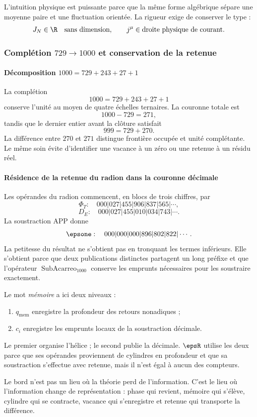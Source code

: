 L'intuition physique est puissante parce que la même forme algébrique sépare une
moyenne paire et une fluctuation orientée. La rigueur exige de conserver le type :
\[
J_N\in\R\quad\text{sans dimension},
\qquad
j^\mu\in\text{droite physique de courant}.
\]

\subsubsection{Complétion \(729\to1000\) et conservation de la retenue}

\paragraph{Décomposition \(1000=729+243+27+1\)}

La complétion
\[
1000=729+243+27+1
\]
conserve l'unité au moyen de quatre échelles ternaires. La couronne totale est
\[
1000-729=271,
\]
tandis que le dernier entier avant la clôture satisfait
\[
999=729+270.
\]
La différence entre \(270\) et \(271\) distingue frontière occupée et unité
complétante. Le même soin évite d'identifier une vacance à un zéro ou une
retenue à un résidu réel.

\paragraph{Résidence de la retenue du radion dans la couronne décimale}

Les opérandes du radion commencent, en blocs de trois chiffres, par
\[
\Phi_T:\quad000|027|455|906|837|565|\cdots,
\]
\[
D_E:\quad000|027|455|010|034|743|\cdots.
\]
La soustraction APP donne
\[
\epsone:\quad000|000|000|896|802|822|\cdots.
\]
La petitesse du résultat ne s'obtient pas en tronquant les termes inférieurs.
Elle s'obtient parce que deux publications distinctes partagent un long préfixe et que
l'opérateur \(\operatorname{SubAcarreo}_{1000}\) conserve les emprunts nécessaires
pour les soustraire exactement.

Le mot \emph{mémoire} a ici deux niveaux :
\begin{enumerate}
\item \(q_{\mathrm{mem}}\) enregistre la profondeur des retours nonadiques ;
\item \(c_i\) enregistre les emprunts locaux de la soustraction décimale.
\end{enumerate}
Le premier organise l'hélice ; le second publie la décimale. \(\epsR\) utilise
les deux parce que ses opérandes proviennent de cylindres en profondeur et que sa soustraction
s'effectue avec retenue, mais il n'est égal à aucun des compteurs.

\begin{thesisbox}
Le bord n'est pas un lieu où la théorie perd de l'information. C'est le lieu où
l'information change de représentation : phase qui revient, mémoire qui
s'élève, cylindre qui se contracte, vacance qui s'enregistre et retenue qui
transporte la différence.
\end{thesisbox}

